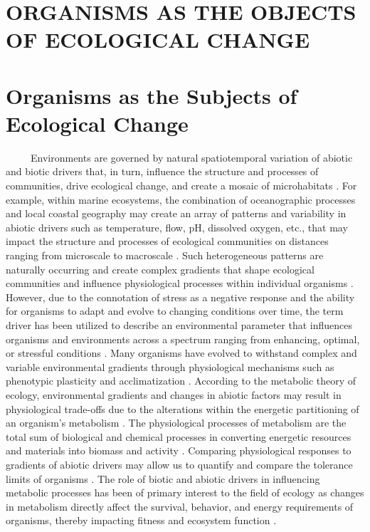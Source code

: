 \documentclass[
]{article}
\begin{document}
\hypertarget{organisms-as-the-objects-of-ecological-change}{%
\section{ORGANISMS AS THE OBJECTS OF ECOLOGICAL
CHANGE}\label{organisms-as-the-objects-of-ecological-change}}

\hypertarget{organisms-as-the-subjects-of-ecological-change}{%
\section{Organisms as the Subjects of Ecological
Change}\label{organisms-as-the-subjects-of-ecological-change}}

~~~~~Environments are governed by natural spatiotemporal variation of
abiotic and biotic drivers that, in turn, influence the structure and
processes of communities, drive ecological change, and create a mosaic
of microhabitats
\citep{connell1961influence, stenseth2002ecological, kroeker2017embracing}.
For example, within marine ecosystems, the combination of oceanographic
processes and local coastal geography may create an array of patterns
and variability in abiotic drivers such as temperature, flow, pH,
dissolved oxygen, etc., that may impact the structure and processes of
ecological communities on distances ranging from microscale to
macroscale \citep{deser2010sea, hofmann2010living}. Such heterogeneous
patterns are naturally occurring and create complex gradients that shape
ecological communities and influence physiological processes within
individual organisms \citep{helmuth2006mosaic}. However, due to the
connotation of stress as a negative response and the ability for
organisms to adapt and evolve to changing conditions over time, the term
driver has been utilized to describe an environmental parameter that
influences organisms and environments across a spectrum ranging from
enhancing, optimal, or stressful conditions
\citep{cote2016interactions, boyd2012understanding}. Many organisms have
evolved to withstand complex and variable environmental gradients
through physiological mechanisms such as phenotypic plasticity and
acclimatization \citep{hofmann2010living, tomanek2002heat}. According to
the metabolic theory of ecology, environmental gradients and changes in
abiotic factors may result in physiological trade-offs due to the
alterations within the energetic partitioning of an organism's
metabolism \citep{portner2008physiology, brown2004metabolic}. The
physiological processes of metabolism are the total sum of biological
and chemical processes in converting energetic resources and materials
into biomass and activity \citep{brown2004metabolic}. Comparing
physiological responses to gradients of abiotic drivers may allow us to
quantify and compare the tolerance limits of organisms
\citep{somero2002thermal, silbiger2019comparative}. The role of biotic
and abiotic drivers in influencing metabolic processes has been of
primary interest to the field of ecology as changes in metabolism
directly affect the survival, behavior, and energy requirements of
organisms, thereby impacting fitness and ecosystem function
\citep{carey2016sea}.
\end{document}
